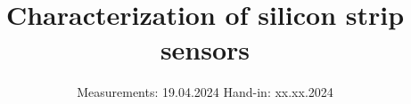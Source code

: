 

\subject{V15}
\title{Characterization of silicon strip sensors}
\date{%
  Measurements: 19.04.2024
  \hspace{3em}
  Hand-in: xx.xx.2024
}



\maketitle
\thispagestyle{empty}
\tableofcontents
\newpage






\printbibliography{}


